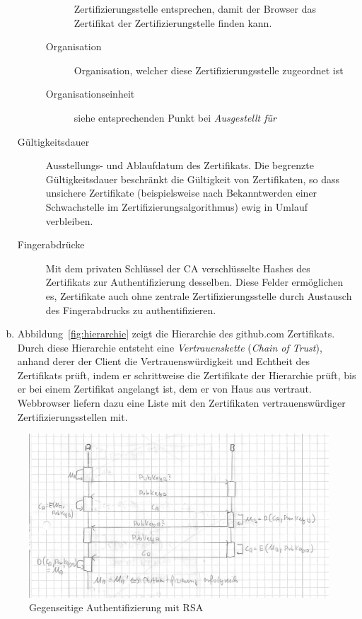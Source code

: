 \documentclass[11pt,a4paper]{scrartcl}
\begin{document}
\begin{enumerate}[a)]
\begin{description}
\begin{description}
      Zertifizierungsstelle entsprechen, damit der Browser das Zertifikat der
      Zertifizierungstelle finden kann.
    \item[Organisation] Organisation, welcher diese Zertifizierungsstelle
      zugeordnet ist
    \item[Organisationseinheit] siehe entsprechenden Punkt bei
      \emph{Ausgestellt für}
    \end{description}
  \item[Gültigkeitsdauer] Ausstellungs- und Ablaufdatum des Zertifikats.  Die
    begrenzte Gültigkeitsdauer beschränkt die Gültigkeit von Zertifikaten, so
    dass unsichere Zertifikate (beispielsweise nach Bekanntwerden einer
    Schwachstelle im Zertifizierungsalgorithmus) ewig in Umlauf verbleiben.
  \item[Fingerabdrücke] Mit dem privaten Schlüssel der CA verschlüsselte Hashes
    des Zertifikats zur Authentifizierung desselben.  Diese Felder ermöglichen
    es, Zertifikate auch ohne zentrale Zertifizierungsstelle durch Austausch
    des Fingerabdrucks zu authentifizieren.
  \end{description}
\item Abbildung~\ref{fig:hierarchie} zeigt die Hierarchie des github.com
  Zertifikats.  Durch diese Hierarchie entsteht eine \emph{Vertrauenskette}
  (\emph{Chain of Trust}), anhand derer der Client die Vertrauenswürdigkeit und
  Echtheit des Zertifikats prüft, indem er schrittweise die Zertifikate der
  Hierarchie prüft, bis er bei einem Zertifikat angelangt ist, dem er von Haus
  aus vertraut.  Webbrowser liefern dazu eine Liste mit den Zertifikaten
  vertrauenswürdiger Zertifizierungsstellen mit.
\end{enumerate}

\begin{figure}[h]
  \centering
  \includegraphics[width=\textwidth]{authentifizierung.png}
  \caption{Gegenseitige Authentifizierung mit RSA}
  \label{fig:authentifizierung}
\end{figure}
\end{document}
